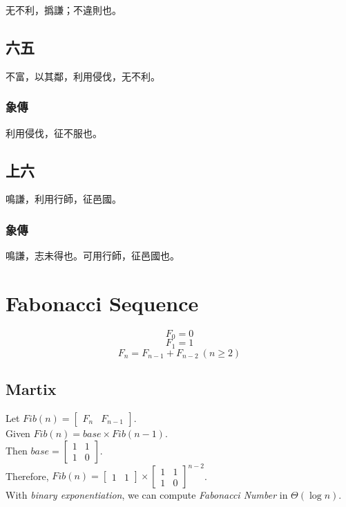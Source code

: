 \documentclass[12pt, a4paper]{article}
\begin{document}
无不利，撝謙；不違則也。

\subsection{六五}

不富，以其鄰，利用侵伐，无不利。

\subsubsection{象傳}

利用侵伐，征不服也。

\subsection{上六}

鳴謙，利用行師，征邑國。

\subsubsection{象傳}

鳴謙，志未得也。可用行師，征邑國也。

\section{Fabonacci Sequence}

\[F_0 = 0\]
\[F_1 = 1\]
\[F_n = F_{n-1} + F_{n-2}\ (n \geq 2)\]

\subsection{Martix}

Let $Fib(n) = \begin{bmatrix} F_n & F_{n-1}\end{bmatrix}$.\\[1cm]
Given $Fib(n) = base \times Fib(n-1)$.\\[1em]
Then $base = \begin{bmatrix} 1 & 1 \\ 1 & 0\end{bmatrix}$.\\
Therefore, $Fib(n) = \begin{bmatrix} 1 & 1\end{bmatrix} \times \begin{bmatrix} 1 & 1 \\ 1 & 0\end{bmatrix}^{n-2}$.\\[10pt]
With \textsl{binary exponentiation}, we can compute \textit{Fabonacci Number} in $\Theta(\log n)$.
\end{document}
